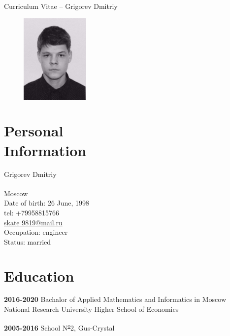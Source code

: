\documentclass[margin,line,a4paper]{resume}
\begin{document}
{\sc \Large Curriculum Vitae -- Grigorev Dmitriy}
\begin{resume}
    \vspace{0.5cm}
    \begin{figure}
        \vspace{-1cm}
       \begin{center}
       \includegraphics[width=0.3\textwidth]{mono_dima.jpg}
       \end{center}
        \vspace{-1cm}
    \end{figure}
    


    \section{\mysidestyle Personal\\Information}%
    Grigorev Dmitriy \\
    \\
    Moscow\\
    Date of birth: 26 June, 1998\\
    tel: +79958815766 \\
    \href{mailto: skate\underline{ }9819@mail.ru}{skate\underline{ }9819@mail.ru} \\
    Occupation: engineer \\
    Status: married\\


    \section{\mysidestyle Education}

    \textbf{2016-2020} Bachalor of Applied Mathematics and Informatics in Moscow National Research University Higher School of Economics 

    \textbf{2005-2016} School N\textsuperscript{\underline{o}}2, Gus-Crystal 
    

\end{resume}
\end{document}
